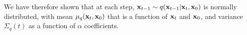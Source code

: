 We have therefore shown that at each step, ${\mathbf{x}}_{t-1} \sim q({\mathbf{x}}_{t-1}|{\mathbf{x}}_t, {\mathbf{x}}_0)$ is normally distributed, with mean $\mu_q({\mathbf{x}}_t,{\mathbf{x}}_0)$ that is a function of ${\mathbf{x}}_t$ and ${\mathbf{x}}_0$, and variance $\Sigma_q(t)$ as a function of $\alpha$ coefficients. 



